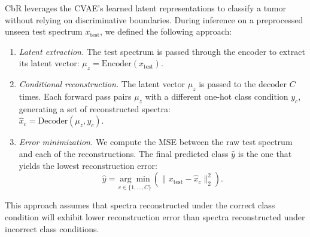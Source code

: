 CbR leverages the CVAE's learned latent representations to classify a tumor without relying on discriminative boundaries. 
During inference on a preprocessed unseen test spectrum $x_{\text{test}}$, we defined the following approach:
\begin{enumerate}
    \item \emph{Latent extraction.} The test spectrum is passed through the encoder to extract its latent vector: $\mu_{z} = \text{Encoder}(x_{\text{test}})$.
    \item \emph{Conditional reconstruction.} The latent vector $\mu_{z}$ is passed to the decoder $C$ times. Each forward pass pairs $\mu_{z}$ with a different one-hot class condition $y_c$, generating a set of reconstructed spectra: \\ $\hat{x}_c = \text{Decoder}(\mu_{z}, y_c)$.
    \item \emph{Error minimization.} We compute the MSE between the raw test spectrum and each of the reconstructions. The final predicted class $\hat{y}$ is the one that yields the lowest reconstruction error:
    \begin{equation}
    \hat{y} = \underset{c \in \{1, \dots, C\}}{\arg \min} \left( \| x_{\text{test}} - \hat{x}_c \|_2^2 \right).
    \end{equation}
\end{enumerate}

This approach assumes that spectra reconstructed under the correct class condition will exhibit lower reconstruction error than spectra reconstructed under incorrect class conditions.
